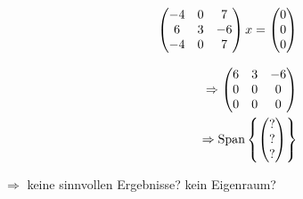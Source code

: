 \documentclass{HM}
\newcommand{\Span}{\text{Span}}
\begin{document}
\begin{enumerate}
\begin{minipage}{.5\textwidth}
\begin{align*}
\begin{pmatrix}
				-4&0&7\\
				6&3&-6\\
				-4&0&7
			\end{pmatrix}x=\begin{pmatrix}
				0\\0\\0
			\end{pmatrix}\\
			\intertext{}
			\Rightarrow\begin{pmatrix}
				6&3&-6\\
				0&0&0\\
				0&0&0
			\end{pmatrix}\\
			\Rightarrow\Span\left\lbrace\begin{pmatrix}
				?\\
				?\\
				?
			\end{pmatrix}\right\rbrace
			\end{align*}
		\end{minipage}
		$\Rightarrow$ keine sinnvollen Ergebnisse? kein Eigenraum?
	\end{enumerate}
\end{document}
